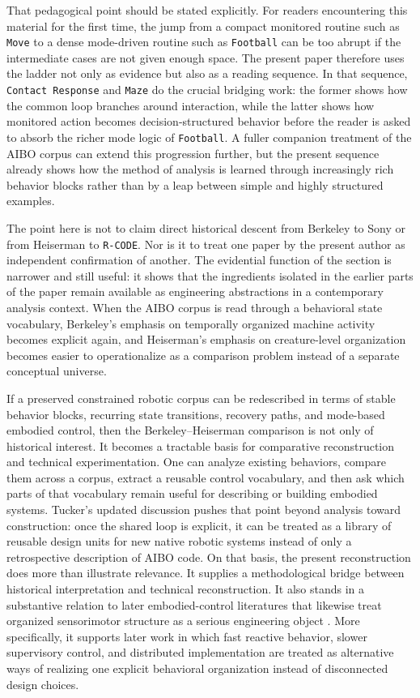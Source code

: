 \documentclass[11pt]{article}
\begin{document}
That pedagogical point should be stated explicitly. For readers encountering this material for the first time, the jump from a compact monitored routine such as \texttt{Move} to a dense mode-driven routine such as \texttt{Football} can be too abrupt if the intermediate cases are not given enough space. The present paper therefore uses the ladder not only as evidence but also as a reading sequence. In that sequence, \texttt{Contact Response} and \texttt{Maze} do the crucial bridging work: the former shows how the common loop branches around interaction, while the latter shows how monitored action becomes decision-structured behavior before the reader is asked to absorb the richer mode logic of \texttt{Football}. A fuller companion treatment of the AIBO corpus can extend this progression further, but the present sequence already shows how the method of analysis is learned through increasingly rich behavior blocks rather than by a leap between simple and highly structured examples.

The point here is not to claim direct historical descent from Berkeley to Sony or from Heiserman to \texttt{R-CODE}. Nor is it to treat one paper by the present author as independent confirmation of another. The evidential function of the section is narrower and still useful: it shows that the ingredients isolated in the earlier parts of the paper remain available as engineering abstractions in a contemporary analysis context. When the AIBO corpus is read through a behavioral state vocabulary, Berkeley's emphasis on temporally organized machine activity becomes explicit again, and Heiserman's emphasis on creature-level organization becomes easier to operationalize as a comparison problem instead of a separate conceptual universe.

If a preserved constrained robotic corpus can be redescribed in terms of stable behavior blocks, recurring state transitions, recovery paths, and mode-based embodied control, then the Berkeley--Heiserman comparison is not only of historical interest. It becomes a tractable basis for comparative reconstruction and technical experimentation. One can analyze existing behaviors, compare them across a corpus, extract a reusable control vocabulary, and then ask which parts of that vocabulary remain useful for describing or building embodied systems. Tucker's updated discussion pushes that point beyond analysis toward construction: once the shared loop is explicit, it can be treated as a library of reusable design units for new native robotic systems instead of only a retrospective description of AIBO code. On that basis, the present reconstruction does more than illustrate relevance. It supplies a methodological bridge between historical interpretation and technical reconstruction. It also stands in a substantive relation to later embodied-control literatures that likewise treat organized sensorimotor structure as a serious engineering object \citep{brooks1986robust,brooks1991intelligence,braitenberg1984vehicles}. More specifically, it supports later work in which fast reactive behavior, slower supervisory control, and distributed implementation are treated as alternative ways of realizing one explicit behavioral organization instead of disconnected design choices.
\end{document}
